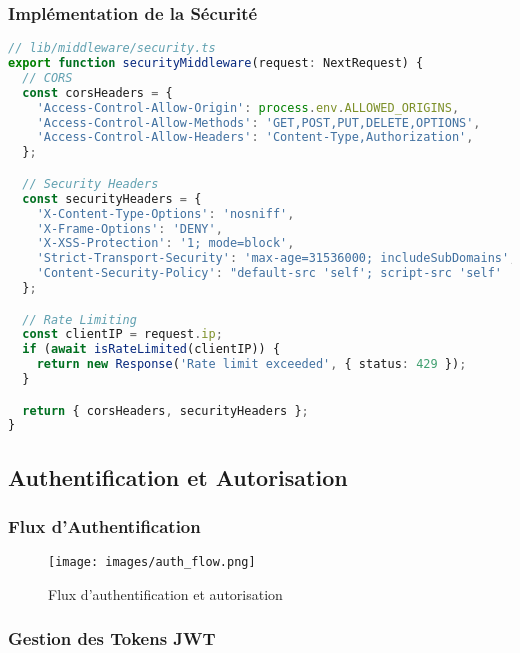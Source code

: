 \subsubsection{Implémentation de la Sécurité}

\begin{lstlisting}[language=TypeScript, caption=Middleware de sécurité]
// lib/middleware/security.ts
export function securityMiddleware(request: NextRequest) {
  // CORS
  const corsHeaders = {
    'Access-Control-Allow-Origin': process.env.ALLOWED_ORIGINS,
    'Access-Control-Allow-Methods': 'GET,POST,PUT,DELETE,OPTIONS',
    'Access-Control-Allow-Headers': 'Content-Type,Authorization',
  };

  // Security Headers
  const securityHeaders = {
    'X-Content-Type-Options': 'nosniff',
    'X-Frame-Options': 'DENY',
    'X-XSS-Protection': '1; mode=block',
    'Strict-Transport-Security': 'max-age=31536000; includeSubDomains',
    'Content-Security-Policy': "default-src 'self'; script-src 'self' 'unsafe-inline'",
  };

  // Rate Limiting
  const clientIP = request.ip;
  if (await isRateLimited(clientIP)) {
    return new Response('Rate limit exceeded', { status: 429 });
  }

  return { corsHeaders, securityHeaders };
}
\end{lstlisting}

\subsection{Authentification et Autorisation}

\subsubsection{Flux d'Authentification}

\begin{figure}[H]
    \centering
    \texttt{[image: images/auth\_flow.png]}
    \caption{Flux d'authentification et autorisation}
    \label{fig:auth_flow}
\end{figure}

\subsubsection{Gestion des Tokens JWT}

